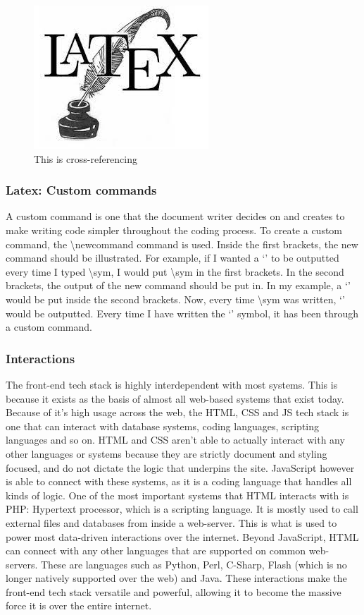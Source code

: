 \documentclass[a4paper, 11pt]{report}
\begin{document}
\begin{figure}[h]
\centering
\includegraphics{latex.jpg}
\caption{This is cross-referencing}
\label{example}
\end{figure}

\subsubsection{Latex: Custom commands}
\newcommand{\sym}{
{`'}
}
A custom command is one that the document writer decides on and creates to make writing code simpler throughout the coding process. To create a custom command, the \textbackslash newcommand{}{} command is used. Inside the first brackets, the new command should be illustrated. For example, if I wanted a \sym to be outputted every time I typed \textbackslash sym, I would put \textbackslash sym in the first brackets. In the second brackets, the output of the new command should be put in. In my example, a \sym would be put inside the second brackets. Now, every time \textbackslash sym was written, \sym would be outputted. Every time I have written the \sym symbol, it has been through a custom command.\cite{jake12}

\subsubsection{Interactions}
The front-end tech stack is highly interdependent with most systems. This is because it exists as the basis of almost all web-based systems that exist today. Because of it’s high usage across the web, the HTML, CSS and JS tech stack is one that can interact with database systems, coding languages, scripting languages and so on.
HTML and CSS aren’t able to actually interact with any other languages or systems because they are strictly document and styling focused, and do not dictate the logic that underpins the site. JavaScript however is able to connect with these systems, as it is a coding language that handles all kinds of logic.
One of the most important systems that HTML interacts with is PHP: Hypertext processor, which is a scripting language. It is mostly used to call external files and databases from inside a web-server. This is what is used to power most data-driven interactions over the internet.
Beyond JavaScript, HTML can connect with any other languages that are supported on common web-servers. These are languages such as Python, Perl, C-Sharp, Flash (which is no longer natively supported over the web) and Java.
These interactions make the front-end tech stack versatile and powerful, allowing it to become the massive force it is over the entire internet.
\end{document}
